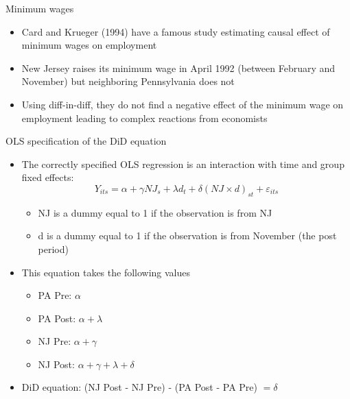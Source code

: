 \documentclass{beamer}
\begin{document}
\begin{frame}{Minimum wages}

\begin{itemize}
\item Card and Krueger (1994) have a famous study estimating causal effect of minimum wages on employment
\item  New Jersey raises its minimum wage in April 1992 (between February and November) but neighboring Pennsylvania does not
\item Using diff-in-diff, they do not find a negative effect of the minimum wage on employment leading to complex reactions from economists
\end{itemize}

\end{frame}





\begin{frame}{OLS specification of the DiD equation}

	\begin{itemize}
	\item The correctly specified OLS regression is an interaction with time and group fixed effects:$$Y_{its} = \alpha + \gamma NJ_s + \lambda d_t + \delta (NJ \times d)_{st} + \varepsilon_{its}$$
		\begin{itemize}
		\item NJ is a dummy equal to 1 if the observation is from NJ
		\item d is a dummy equal to 1 if the observation is from November (the post period)
		\end{itemize}
	\item This equation takes the following values
		\begin{itemize}
		\item PA Pre: $\alpha$
		\item PA Post: $\alpha + \lambda$
		\item NJ Pre: $\alpha + \gamma$
		\item NJ Post: $\alpha + \gamma + \lambda + \delta$
		\end{itemize}
	\item DiD equation: (NJ Post - NJ Pre) - (PA Post - PA Pre) $= \delta$
	\end{itemize}
\end{frame}
\end{document}
